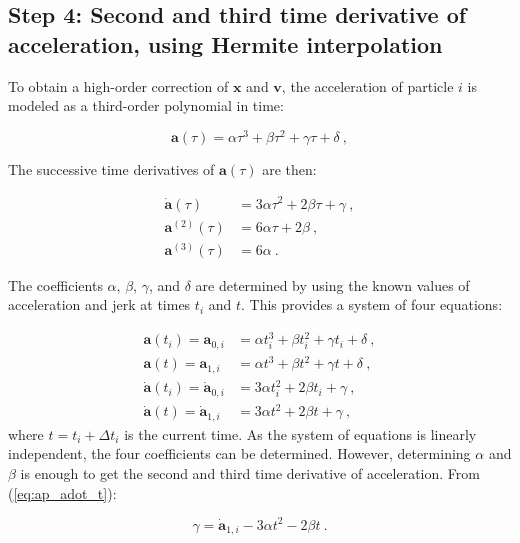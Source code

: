 \begin{appendixs}
	\subsection{Step 4: Second and third time derivative of acceleration, using Hermite interpolation}
	\label{ap:A.4}
	
	To obtain a high-order correction of $\mathbf{x}$ and $\mathbf{v}$, the acceleration of particle $i$ is modeled as a third-order polynomial in time:
	
	\begin{equation}
		\mathbf{a}(\tau) = \alpha \tau^3 + \beta \tau^2 + \gamma \tau + \delta ~,\label{eq:ap_accel_pol}
	\end{equation}
	
	The successive time derivatives of $\mathbf{a}(\tau)$ are then:
	
	\begin{align}
		\dot{\mathbf{a}}(\tau) &= 3 \alpha \tau^2 + 2 \beta \tau + \gamma \label{eq:ap_jerk_pol} ~,\\
		\mathbf{a}^{(2)} (\tau) &= 6 \alpha \tau + 2 \beta \label{eq:ap_a2_pol} ~,\\
		\mathbf{a}^{(3)} (\tau) &= 6 \alpha~. \label{eq:ap_a3_pol}
	\end{align}
	
	The coefficients $\alpha$, $\beta$, $\gamma$, and $\delta$ are determined by using the known values of acceleration and jerk at times $t_i$ and $t$. This provides a system of four equations:
	
	\begin{align}
		\mathbf{a}(t_i) = \mathbf{a}_{0, i} &=  \alpha t_i^3 + \beta t_i^2 + \gamma t_i + \delta \label{eq:ap_a_ti} ~,\\
		\mathbf{a}(t) = \mathbf{a}_{1, i} &=  \alpha t^3 + \beta t^2 + \gamma t + \delta \label{eq:ap_a_t} ~,\\
		\dot{\mathbf{a}}(t_i) = \dot{\mathbf{a}}_{0, i} &= 3 \alpha t_i^2 + 2 \beta t_i + \gamma \label{eq:ap_adot_ti} ~,\\
		\dot{\mathbf{a}}(t) = \dot{\mathbf{a}}_{1, i} &= 3 \alpha t^2 + 2 \beta t + \gamma ~,\label{eq:ap_adot_t}
	\end{align}
	where $t = t_i + \Delta t_i$ is the current time. As the system of equations is linearly independent, the four coefficients can be determined. However, determining $\alpha$ and $\beta$ is enough to get the second and third time derivative of acceleration. From (\ref{eq:ap_adot_t}):
	
	\begin{equation}
		\gamma = \dot{\mathbf{a}}_{1, i} - 3 \alpha t^2 - 2 \beta t ~.\label{eq:app_gamma}
	\end{equation}
	

\end{appendixs}
